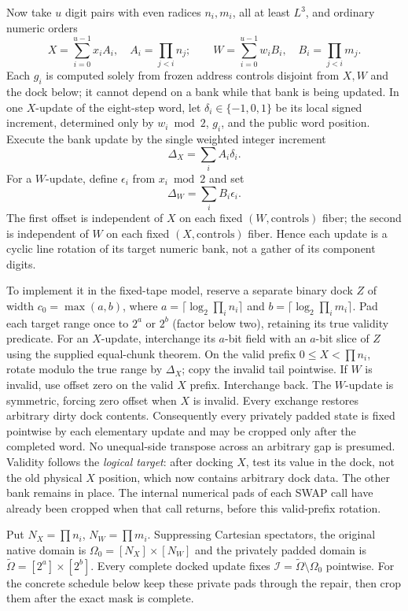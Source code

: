 Now take $u$ digit pairs with even radices $n_i,m_i$, all at least $L^3$,
and ordinary numeric orders
\[
 X=\sum_{i=0}^{u-1}x_iA_i,\quad A_i=\prod_{j<i}n_j;
 \qquad
 W=\sum_{i=0}^{u-1}w_iB_i,\quad B_i=\prod_{j<i}m_j.
\]
Each $g_i$ is computed solely from frozen address controls disjoint from
$X,W$ and the dock below; it cannot depend on a bank while that bank is
being updated.  In one $X$-update of the eight-step word, let
$\delta_i\in\{-1,0,1\}$ be its local signed increment, determined only
by $w_i\bmod2$, $g_i$, and the public word position.  Execute the bank
update by the single weighted integer increment
\[
                 \Delta_X=\sum_i A_i\delta_i.
\]
For a $W$-update, define $\epsilon_i$ from $x_i\bmod2$ and set
\[
                 \Delta_W=\sum_i B_i\epsilon_i.
\]
The first offset is independent of $X$ on each fixed $(W,\text{controls})$
fiber; the second is independent of $W$ on each fixed
$(X,\text{controls})$ fiber.  Hence each update is a cyclic line rotation
of its target numeric bank, not a gather of its component digits.

To implement it in the fixed-tape model, reserve a separate binary dock
$Z$ of width $c_0=\max(a,b)$, where
$a=\lceil\log_2\prod_i n_i\rceil$ and
$b=\lceil\log_2\prod_i m_i\rceil$.  Pad each target range once to
$2^a$ or $2^b$ (factor below two), retaining its true validity predicate.
For an $X$-update, interchange its $a$-bit field with an $a$-bit slice of
$Z$ using the supplied equal-chunk theorem.  On the valid prefix
$0\le X<\prod n_i$, rotate modulo the true range by $\Delta_X$; copy the
invalid tail pointwise.  If $W$ is invalid, use offset zero on the valid
$X$ prefix.  Interchange back.  The $W$-update is symmetric, forcing zero
offset when $X$ is invalid.  Every exchange restores arbitrary dirty dock
contents.  Consequently every privately padded state is fixed pointwise
by each elementary update and may be cropped only after the completed
word.  No unequal-side transpose across an arbitrary gap is presumed.
Validity follows the \emph{logical target}: after docking $X$, test
its value in the dock, not the old physical $X$ position, which now
contains arbitrary dock data. The other bank remains in place.
The internal numerical pads of each SWAP call have already been
cropped when that call returns, before this valid-prefix rotation.

Put $N_X=\prod n_i$, $N_W=\prod m_i$. Suppressing Cartesian
spectators, the original native domain is
$\Omega_0=[N_X]\times[N_W]$ and the privately padded domain is
$\widetilde\Omega=[2^a]\times[2^b]$.
Every complete docked update fixes
$\mathcal I=\widetilde\Omega\setminus\Omega_0$ pointwise.
For the concrete schedule below keep these private pads through
the repair, then crop them after the exact mask is complete.

